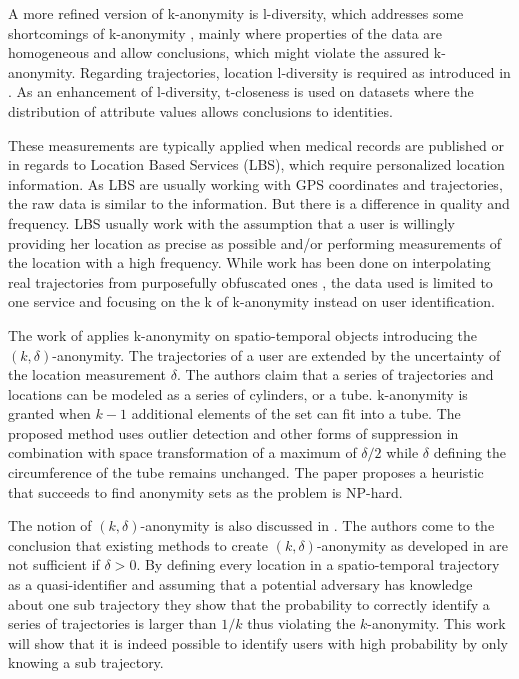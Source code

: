 A more refined version of k-anonymity is l-diversity, which addresses some shortcomings of k-anonymity \cite{Machanavajjhala2006}, mainly where properties of the data are homogeneous and allow conclusions, which might violate the assured k-anonymity. Regarding trajectories, location l-diversity is required as introduced in \citeauthor{Beresford2003} \cite{Beresford2003}. As an enhancement of l-diversity, t-closeness \cite{Li2007} is used on datasets where the distribution of attribute values allows conclusions to identities.

These measurements are typically applied when medical records are published or in regards to Location Based Services (LBS), which require personalized location information. As LBS are usually working with GPS coordinates and trajectories, the raw data is similar to the information. But there is a difference in quality and frequency. LBS usually work with the assumption that a user is willingly providing her location as precise as possible and/or performing measurements of the location with a high frequency. While work has been done on interpolating real trajectories from purposefully obfuscated ones \cite{Naghizade2015}, the data used is limited to one service and focusing on the k of k-anonymity instead on user identification.

The work of \citeauthor{Abul2008} \cite{Abul2008} applies k-anonymity on spatio-temporal objects introducing the $(k, \delta)$-anonymity. The trajectories of a user are extended by the uncertainty of the location measurement $\delta$. The authors claim that a series of trajectories and locations can be modeled as a series of cylinders, or a tube. k-anonymity is granted when $k-1$ additional elements of the set can fit into a tube. The proposed method uses outlier detection and other forms of suppression in combination with space transformation of a maximum of $\delta/2$ while $\delta$ defining the circumference of the tube remains unchanged. The paper proposes a heuristic that succeeds to find anonymity sets as the problem is NP-hard.

The notion of $(k, \delta)$-anonymity is also discussed in \citeauthor{Trujillo-Rasua2013} \cite{Trujillo-Rasua2013}. The authors come to the conclusion
 that existing methods to create $(k, \delta)$-anonymity as developed in \citeauthor{Abul2008} are not sufficient if $\delta > 0$. By defining every location in a spatio-temporal trajectory as a quasi-identifier and assuming that a potential adversary has knowledge about one sub trajectory they show that the probability to correctly identify a series of trajectories is larger than $1/k$ thus violating the $k$-anonymity. This work will show that it is indeed possible to identify users with high probability by only knowing a sub trajectory.
